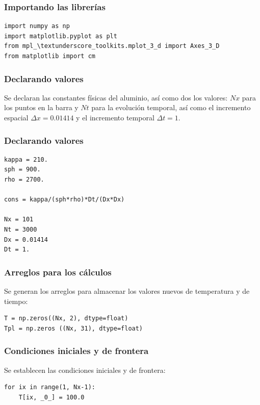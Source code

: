 {
\begin{frame}
\frametitle{Importando las librerías}
\begin{lstlisting}[caption=Llamada a las librerías, style=FormattedNumber, basicstyle=\linespread{1.1}\ttfamily=\small, columns=fullflexible]
import numpy as np
import matplotlib.pyplot as plt
from mpl_\textunderscore_toolkits.mplot_3_d import Axes_3_D
from matplotlib import cm
\end{lstlisting}
\end{frame}
\begin{frame}
\frametitle{Declarando valores}
Se declaran las constantes físicas del aluminio, así como dos los valores: $Nx$ para los puntos en la barra y $Nt$ para la evolución temporal, así como el incremento espacial $\Delta x = 0.01414$ y el incremento temporal $\Delta t= 1$.
\end{frame}
\begin{frame}
\frametitle{Declarando valores}
\begin{lstlisting}[caption=Declarando valores para el algoritmo, style=FormattedNumber, basicstyle=\linespread{1.1}\ttfamily=\small, columns=fullflexible]
kappa = 210.
sph = 900.
rho = 2700.

cons = kappa/(sph*rho)*Dt/(Dx*Dx)

Nx = 101
Nt = 3000
Dx = 0.01414                                                
Dt = 1.
\end{lstlisting}
\end{frame}
\begin{frame}
\frametitle{Arreglos para los cálculos}
Se generan los arreglos para almacenar los valores nuevos de temperatura y de tiempo:
\begin{lstlisting}[caption=Arreglos para los cálculos de temperatura, style=FormattedNumber, basicstyle=\linespread{1.1}\ttfamily=\small, columns=fullflexible]
T = np.zeros((Nx, 2), dtype=float)
Tpl = np.zeros ((Nx, 31), dtype=float)
\end{lstlisting}
\end{frame}
\begin{frame}
\frametitle{Condiciones iniciales y de frontera}
Se establecen las condiciones iniciales y de frontera:
\begin{lstlisting}[caption=Se definen las condiciones iniciales y de frontera, style=FormattedNumber, basicstyle=\linespread{1.1}\ttfamily=\small, columns=fullflexible]
for ix in range(1, Nx-1):
    T[ix, _0_] = 100.0


\end{lstlisting}
\end{frame}}
